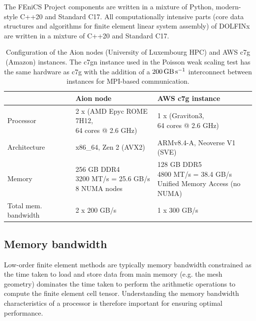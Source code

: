 The FEniCS Project components are written in a mixture of Python, modern-style
C++20 and Standard C17. All computationally intensive parts (core data
structures and algorithms for finite element linear system assembly) of DOLFINx
are written in a mixture of C++20 and Standard C17.

\begin{table}
  \footnotesize
  \renewcommand{\arraystretch}{1.5}
  \begin{tabular}{l|l|l}
                              & Aion node                                                          & AWS c7g instance \\ \hline \hline
    Processor                 & \makecell[l]{2 x (AMD Epyc ROME 7H12, \\ 64 cores @ 2.6 GHz)}      & \makecell[l]{1 x (Graviton3, \\ 64 cores @ 2.6 GHz)} \\ \hline
    Architecture              & x86\_64, Zen 2 (AVX2)                                              & ARMv8.4-A, Neoverse V1 (SVE) \\ \hline
    Memory                    & \makecell[l]{256 GB DDR4 \\ 3200 MT/s = 25.6 GB/s \\ 8 NUMA nodes} & \makecell[l]{128 GB DDR5 \\ 4800 MT/s = 38.4 GB/s  \\ Unified Memory Access (no NUMA) } \\ \hline
    Total mem. bandwidth      & 2 x 200 GB/s                                                       & 1 x 300 GB/s  \\ \hline
  \end{tabular}
  \vspace{5pt}
  \caption{Configuration of the Aion nodes (University of Luxembourg HPC) and
	AWS c7g (Amazon) instances. The c7gn instance used in the Poisson weak
	scaling test has the same hardware as c7g with the addition of a
	$\SI{200}{\giga\byte\per\second}$ interconnect between instances for
	MPI-based communication.}
  \label{tab:aion-aws-config}
\end{table}

\subsection*{Memory bandwidth}

Low-order finite element methods are typically memory bandwidth constrained as
the time taken to load and store data from main memory (e.g. the mesh geometry)
dominates the time taken to perform the arithmetic operations to compute the
finite element cell tensor. Understanding the memory bandwidth characteristics
of a processor is therefore important for ensuring optimal performance.

